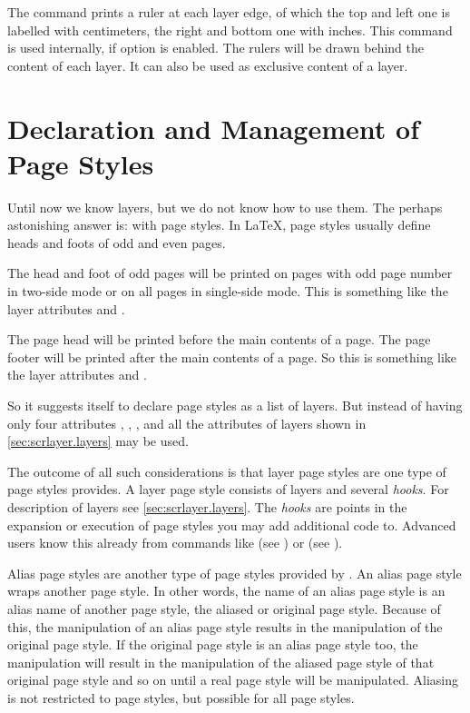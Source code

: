 \begin{Declaration}
\end{Declaration}
The command  prints a ruler at each layer edge, of
which the top and left one is labelled with centimeters, the right and bottom
one with inches.  This command is used internally, if option
 is enabled. The rulers will be drawn behind
the content of each layer.  It can also be used as exclusive content of a
layer.%
\EndIndexGroup


\section{Declaration and Management of Page Styles}

Until now we know layers, but we do not know how to use them. The
perhaps astonishing answer is: with page styles. In \LaTeX{}, page
styles usually define heads and foots of odd and even pages.

The head and foot of odd pages will be printed on pages with odd
page number in two-side mode or on all pages in single-side mode. This is
something like the layer attributes  and .

The page head will be printed before the main contents of a page. The page
footer will be printed after the main contents of a page. So this is something
like the layer attributes  and .

So it suggests itself to declare page styles as a list of layers. But instead of
having only four attributes , ,
, and  all the attributes of layers
shown in \autoref{sec:scrlayer.layers} may be used.

The outcome of all such considerations is that layer page styles are one type
of page styles  provides. A layer page style consists of
layers and several \emph{hooks}. For description of layers see
\autoref{sec:scrlayer.layers}.  The \emph{hooks} are points in the expansion
or execution of page styles you may add additional code to. Advanced users
know this already from commands like  (see
\cite{latex:usrguide}) or  (see
).

Alias page styles are another type of page styles provided by
. An alias page style wraps another page style. In other
words, the name of an alias page style is an alias name of another page style,
the aliased or original page style. Because of this, the manipulation of an
alias page style results in the manipulation of the original page style. If
the original page style is an alias page style too, the manipulation will
result in the manipulation of the aliased page style of that original page
style and so on until a real page style will be manipulated. Aliasing is not
restricted to  page styles, but possible for all page
styles.

